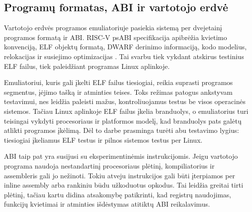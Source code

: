 \subsection{Programų formatas, ABI ir vartotojo erdvė}
\label{subsec:elf-abi-userspace}

Vartotojo erdvės programos emuliatoriuje pasiekia sistemą per dvejetainį programos formatą ir ABI. RISC-V psABI specifikacija apibrėžia kvietimo konvenciją, ELF objektų formatą, DWARF derinimo informaciją, kodo modelius, relokacijas ir susiejimo optimizacijas \cite{riscv-psabi}. Tai svarbu tiek vykdant atskirus testinius ELF failus, tiek paleidžiant programas Linux aplinkoje.

Emuliatoriui, kuris gali įkelti ELF failus tiesiogiai, reikia suprasti programos segmentus, įėjimo tašką ir atminties teises. Toks režimas patogus ankstyvam testavimui, nes leidžia paleisti mažus, kontroliuojamus testus be visos operacinės sistemos. Tačiau Linux aplinkoje ELF failus įkelia branduolys, o emuliatorius turi teisingai vykdyti procesoriaus ir platformos modelį, kad branduolys pats galėtų atlikti programos įkėlimą. Dėl to darbe prasminga turėti abu testavimo lygius: tiesiogiai įkeliamus ELF testus ir pilnos sistemos testus per Linux.

ABI taip pat yra susijusi su eksperimentinėmis instrukcijomis. Jeigu vartotojo programa naudoja nestandartinį procesoriaus plėtinį, kompiliatorius ir assembleris gali jo nežinoti. Tokiu atveju instrukcijos gali būti įterpiamos per inline assembly arba rankiniu būdu užkoduotus opkodus. Tai leidžia greitai tirti plėtinį, tačiau kartu didina atsakomybę patikrinti, kad registrų naudojimas, funkcijų kvietimai ir atminties išdėstymas atitiktų ABI reikalavimus.
